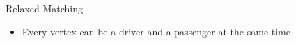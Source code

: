 \begin{frame}{Relaxed Matching}
\begin{itemize}
  \item<1> Every vertex can be a driver and a passenger at the same time
\end{itemize}
\centering
\scalebox{.90}{

}
\end{frame}